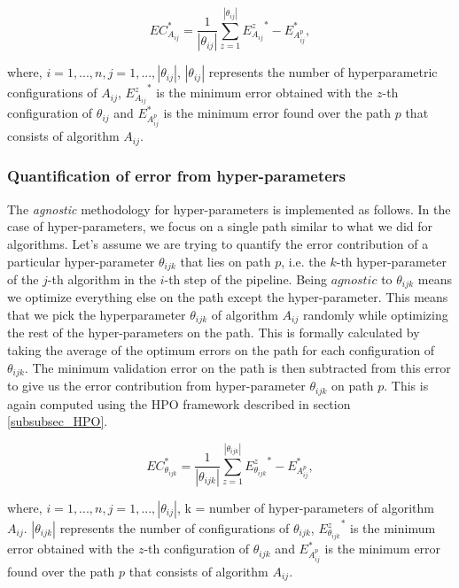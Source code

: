 \begin{equation}
\label{eq_alg}
EC_{A_{ij}}^* = \frac{1}{|\theta_{ij}|}\sum_{z=1}^{|\theta_{ij}|} {E_{A_{ij}}^z}^* - {E_{A_{ij}^p}^*},
\end{equation}

where, $i = {1, ..., n}, j = {1, ..., |\theta_{ij}|}$, $|\theta_{ij}|$ represents the number of hyperparametric configurations of $A_{ij}$,  ${E_{A_{ij}}^z}^*$ is the minimum error obtained with the $z$-th configuration of $\theta_{ij}$ and $E_{A_{ij}^p}^*$ is the minimum error found over the path $p$ that consists of algorithm $A_{ij}$.


\subsubsection{Quantification of error from hyper-parameters}
\label{subsubsec_eq_hyper}
The \textit{agnostic} methodology for hyper-parameters is implemented as follows. In the case of hyper-parameters, we focus on a single path similar to what we did for algorithms. Let's assume we are trying to quantify the error contribution of a particular hyper-parameter $\theta_{ijk}$ that lies on path $p$, i.e. the $k$-th hyper-parameter of the $j$-th algorithm in the $i$-th step of the pipeline. Being $agnostic$ to $\theta_{ijk}$ means we optimize everything else on the path except the hyper-parameter. This means that we pick the hyperparameter $\theta_{ijk}$ of algorithm $A_{ij}$ randomly while optimizing the rest of the hyper-parameters on the path. This is formally calculated by taking the average of the optimum errors on the path for each configuration of $\theta_{ijk}$. The minimum validation error on the path is then subtracted from this error to give us the error contribution from hyper-parameter $\theta_{ijk}$ on path $p$. This is again computed using the HPO framework described in section \ref{subsubsec_HPO}.

\begin{equation}
\label{eq_hyper}
EC_{\theta_{ijk}}^* = \frac{1}{|\theta_{ijk}|}\sum_{z=1}^{|\theta_{ijk}|} {E_{\theta_{ijk}}^z}^* - {E_{A_{ij}^p}^*},
\end{equation}

where, $i = {1, ..., n}, j = {1, ..., |\theta_{ij}|}$, k = number of hyper-parameters of algorithm $A_{ij}$. $|\theta_{ijk}|$ represents the number of configurations of $\theta_{ijk}$,  ${E_{\theta_{ijk}}^z}^*$ is the minimum error obtained with the $z$-th configuration of $\theta_{ijk}$ and $E_{A_{ij}^p}^*$ is the minimum error found over the path $p$ that consists of algorithm $A_{ij}$.

